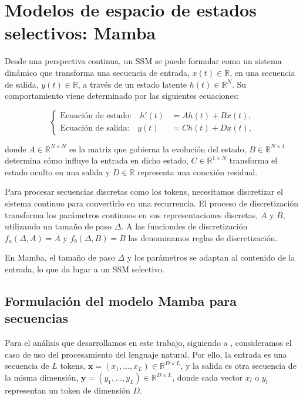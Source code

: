 \section{Modelos de espacio de estados selectivos: Mamba}
\label{sec:ssm}
Desde una perspectiva continua, un SSM se puede formular como un sistema dinámico que transforma una 
secuencia de entrada, $x(t)\in\mathbb{R}$, en una secuencia de salida, $y(t)\in\mathbb{R}$, a través de 
un estado latente $h(t)\in\mathbb{R}^N$. Su comportamiento viene determinado por las siguientes ecuaciones:

\begin{equation}
\label{eq:ssm-continuous}
\left\{
\begin{aligned}
\text{Ecuación de estado:} \quad h'(t) &= A h(t) + B x(t),\\
\text{Ecuación de salida:} \quad y(t) &= C h(t) + D x(t),
\end{aligned}
\right.
\end{equation}

donde $A\in\mathbb{R}^{N\times N}$ es la matriz que gobierna la evolución del estado, $B\in\mathbb{R}^{N\times 1}$ 
determina cómo influye la entrada en dicho estado, $C\in\mathbb{R}^{1\times N}$ transforma el estado oculto 
en una salida y $D\in\mathbb{R}$ representa una conexión residual.

Para procesar secuencias discretas como los tokens, necesitamos discretizar el sistema continuo para 
convertirlo en una recurrencia. El proceso de discretización transforma los parámetros continuos en sus 
representaciones discretas, $\overline{A}$ y $\overline{B}$, utilizando un tamaño de paso $\Delta$. A 
las funciondes de discretización $f_a(\Delta, A) = \overline{A}$ y $f_b(\Delta, B) = \overline{B}$ las 
denominamos reglas de discretización.

En Mamba, el tamaño de paso $\Delta$ y los parámetros se adaptan al contenido de la entrada, lo que 
da lugar a un SSM selectivo.

\subsection{Formulación del modelo Mamba para secuencias}

Para el análisis que desarrollamos en este trabajo, siguiendo a \cite{vo2025token}, consideramos el caso de 
uso del procesamiento del lenguaje natural. Por ello, la entrada es una secuencia de $L$ tokens, $\mathbf{x}=(x_1,\ldots,x_L)\in\mathbb{R}^{D\times L}$, 
y la salida es otra secuencia de la misma dimensión, $\mathbf{y}=(y_1,\ldots,y_L)\in\mathbb{R}^{D\times L}$, 
donde cada vector $x_l$ o $y_l$ representan un token de dimensión $D$. 

